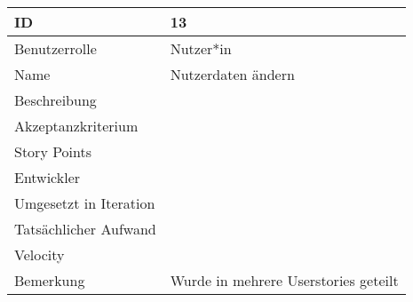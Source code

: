 \begin{tabularx}{\textwidth}{|p{}|X|}
	\hline
	ID & 13\\
	\hline
	Benutzerrolle & Nutzer*in\\
	\hline
	Name & Nutzerdaten ändern\\
	\hline
	Beschreibung & \\
	\hline
	Akzeptanzkriterium & \\
	\hline
	Story Points & \\
	\hline
	Entwickler & \\
	\hline
	Umgesetzt in Iteration & \\ 
	\hline
	Tatsächlicher Aufwand & \\
	\hline
	Velocity & \\
	\hline
	Bemerkung & Wurde in mehrere Userstories geteilt\\
	\hline
\end{tabularx}
\vspace{20pt}
